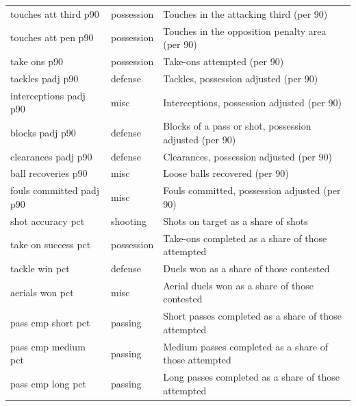\begin{table}[t]
\begin{tabular}{llp{7.0cm}}
touches att third p90 & possession & Touches in the attacking third (per 90) \\
touches att pen p90 & possession & Touches in the opposition penalty area (per 90) \\
take ons p90 & possession & Take-ons attempted (per 90) \\
tackles padj p90 & defense & Tackles, possession adjusted (per 90) \\
interceptions padj p90 & misc & Interceptions, possession adjusted (per 90) \\
blocks padj p90 & defense & Blocks of a pass or shot, possession adjusted (per 90) \\
clearances padj p90 & defense & Clearances, possession adjusted (per 90) \\
ball recoveries p90 & misc & Loose balls recovered (per 90) \\
fouls committed padj p90 & misc & Fouls committed, possession adjusted (per 90) \\
shot accuracy pct & shooting & Shots on target as a share of shots \\
take on success pct & possession & Take-ons completed as a share of those attempted \\
tackle win pct & defense & Duels won as a share of those contested \\
aerials won pct & misc & Aerial duels won as a share of those contested \\
pass cmp short pct & passing & Short passes completed as a share of those attempted \\
pass cmp medium pct & passing & Medium passes completed as a share of those attempted \\
pass cmp long pct & passing & Long passes completed as a share of those attempted \\
\bottomrule
\end{tabular}
\end{table}

